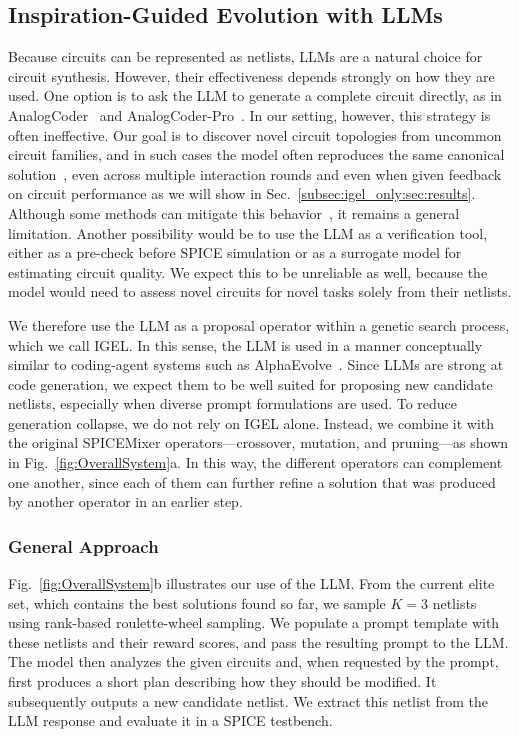 \documentclass[sigconf,pbalance]{acmart_modified}
\newcommand{\squeezeSubSection}{}
\newcommand{\spm}{SPICE\-Mixer}
\begin{document}
\squeezeSubSection\subsection{Inspiration-Guided Evolution with LLMs}
\label{subsec:llm_proposal_operator:sec:llm_spicemixer}
Because circuits can be represented as netlists, LLMs are a natural choice for circuit synthesis. However, their effectiveness depends strongly on how they are used. One option is to ask the LLM to generate a complete circuit directly, as in AnalogCoder~\cite{lai2025analogcoder} and AnalogCoder-Pro~\cite{lai2026analogcoder}. In our setting, however, this strategy is often ineffective. Our goal is to discover novel circuit topologies from uncommon circuit families, and in such cases the model often reproduces the same canonical solution~\cite{wright2025epistemic,yun2025price}, even across multiple interaction rounds and even when given feedback on circuit performance as we will show in Sec.~\ref{subsec:igel_only:sec:results}. Although some methods can mitigate this behavior~\cite{zhang2025verbalized}, it remains a general limitation. Another possibility would be to use the LLM as a verification tool, either as a pre-check before SPICE simulation or as a surrogate model for estimating circuit quality. We expect this to be unreliable as well, because the model would need to assess novel circuits for novel tasks solely from their netlists.

We therefore use the LLM as a proposal operator within a genetic search process, which we call IGEL. In this sense, the LLM is used in a manner conceptually similar to coding-agent systems such as AlphaEvolve~\cite{novikov2025alphaevolve}. Since LLMs are strong at code generation, we expect them to be well suited for proposing new candidate netlists, especially when diverse prompt formulations are used. To reduce generation collapse, we do not rely on IGEL alone. Instead, we combine it with the original \spm{} operators---crossover, mutation, and pruning---as shown in Fig.~\ref{fig:OverallSystem}a. In this way, the different operators can complement one another, since each of them can further refine a solution that was produced by another operator in an earlier step.

\subsubsection*{General Approach}
Fig.~\ref{fig:OverallSystem}b illustrates our use of the LLM. From the current elite set, which contains the best solutions found so far, we sample $K=3$ netlists using rank-based roulette-wheel sampling. We populate a prompt template with these netlists and their reward scores, and pass the resulting prompt to the LLM. The model then analyzes the given circuits and, when requested by the prompt, first produces a short plan describing how they should be modified. It subsequently outputs a new candidate netlist. We extract this netlist from the LLM response and evaluate it in a SPICE testbench.
\end{document}
